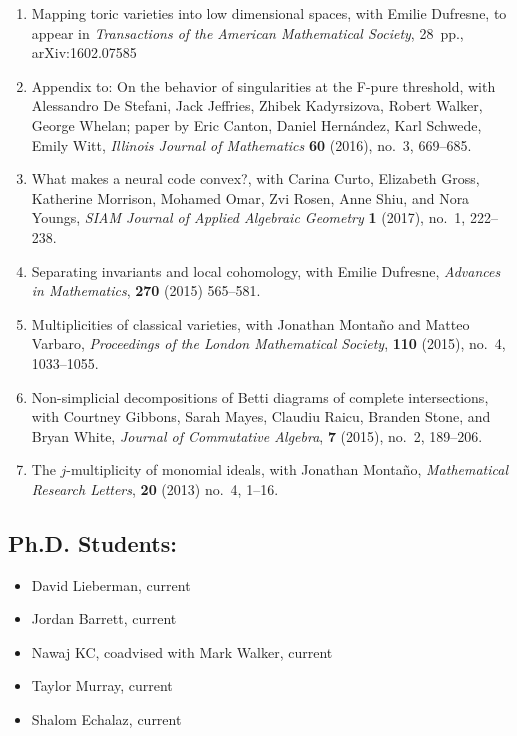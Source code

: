 \documentclass[12pt]{amsart}
\begin{document}
\begin{enumerate}[leftmargin=9mm]
\item Mapping toric varieties into low dimensional spaces, with Emilie Dufresne, to appear in \emph{Transactions of the American Mathematical Society}, 28~pp., arXiv:1602.07585
\item Appendix to: On the behavior of singularities at the F-pure threshold, with Alessandro De Stefani, Jack Jeffries, Zhibek Kadyrsizova, Robert Walker, George Whelan; paper by Eric Canton, Daniel Hern\'andez, Karl Schwede, Emily Witt, \emph{Illinois Journal of Mathematics} \textbf{60} (2016), no.~3, 669--685.
\item What makes a neural code convex?, with Carina Curto, Elizabeth Gross, Katherine Morrison, Mohamed Omar, Zvi Rosen, Anne Shiu, and Nora Youngs, \emph{SIAM Journal of Applied Algebraic Geometry} \textbf{1} (2017), no.~1, 222--238.
\item Separating invariants and local cohomology, with Emilie Dufresne, \emph{Advances in Mathematics}, \textbf{270} (2015) 565--581.
\item \sloppy Multiplicities of classical varieties, with Jonathan Monta\~no and Matteo Varbaro, \emph{Proceedings of the London Mathematical Society}, {\bf 110} (2015), no.~4, 1033--1055.
\item Non-simplicial decompositions of Betti diagrams of complete intersections, with Courtney Gibbons, Sarah Mayes, Claudiu Raicu, Branden Stone, and Bryan White, \emph{Journal of Commutative Algebra}, \textbf{7} (2015), no.~2, 189--206.
\item The $j$-multiplicity of monomial ideals, with Jonathan Monta\~no, \emph{Mathematical Research Letters}, {\bf 20} (2013) no.~4, 1--16.



\end{enumerate}



\subsection*{Ph.D. Students:}
\begin{itemize}[leftmargin=9mm]
	\item David Lieberman, current
	\item Jordan Barrett, current
	\item Nawaj KC, coadvised with Mark Walker, current
	\item Taylor Murray, current
	\item Shalom Echalaz, current
	\end{itemize}
\end{document}
